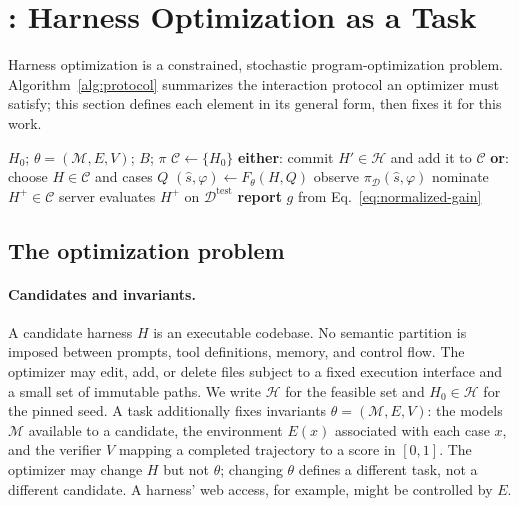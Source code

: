 \section{\heb: Harness Optimization as a Task}
\label{sec:task}

Harness optimization is a constrained, stochastic
program-optimization problem. Algorithm~\ref{alg:protocol} summarizes the
interaction protocol an optimizer must satisfy; this section defines each element in its
general form, then fixes it for this work.

\begin{algorithm}[t]
\caption{The \heb\ protocol}
\label{alg:protocol}
\begin{algorithmic}[1]
\Require $H_0$; $\theta=(\mathcal{M},E,V)$; $B$; $\pi$
\State $\mathcal{C}\gets\{H_0\}$
  \State \textbf{either}: commit $H'\in\mathcal{H}$ and add it to $\mathcal{C}$
  \State \textbf{or}: choose $H\in\mathcal{C}$ and cases $Q$
  \State $(\hat{s},\varphi)\gets F_{\theta}(H,Q)$
  \State observe $\pi_{\mathcal{D}}(\hat{s},\varphi)$
\EndWhile
\State nominate $H^{+}\in\mathcal{C}$
\State server evaluates $H^{+}$ on $\mathcal{D}^{\mathrm{test}}$
\State \textbf{report} $g$ from Eq.~\ref{eq:normalized-gain}
\end{algorithmic}
\end{algorithm}

\subsection{The optimization problem}

\paragraph{Candidates and invariants.}
A candidate harness $H$ is an executable codebase. No semantic partition is imposed between
prompts, tool definitions, memory, and control flow. The optimizer may edit, add,
or delete files subject to a fixed execution interface and a small set of
immutable paths. We write $\mathcal{H}$ for the feasible set and
$H_0\in\mathcal{H}$ for the pinned seed. A task additionally fixes invariants $\theta=(\mathcal{M},E,V)$:
the models $\mathcal{M}$ available to a candidate, the environment $E(x)$ associated with each case $x$, and the verifier $V$ mapping a completed trajectory to a score in $[0,1]$. The optimizer may change $H$ but not $\theta$; changing $\theta$ defines a different task, not a different candidate. A harness' web access, for example, might be controlled by $E$. 

